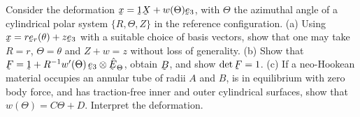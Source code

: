 \begin{problem}
Consider the deformation $\bx=\shift\bX+w(\Theta)\be_{3}$, with $\Theta$
the azimuthal angle of a cylindrical polar system $\{R,\Theta,Z\}$ in
the reference configuration.
\textup{(a)} Using $\bx=r\ber(\theta)+z\be_{3}$ with a suitable choice
of basis vectors, show that one may take $R=r$, $\Theta=\theta$ and
$Z+w=z$ without loss of generality.
\textup{(b)} Show that
$\bF=\shift+R^{-1}w'(\Theta)\,\be_{3}\otimes\hbE_{\Theta}$, obtain
$\bB$, and show $\det\bF=1$.
\textup{(c)} If a neo-Hookean material occupies an annular tube of
radii $A$ and $B$, is in equilibrium with zero body force, and has
traction-free inner and outer cylindrical surfaces, show that
$w(\Theta)=C\Theta+D$. Interpret the deformation.
\end{problem}

